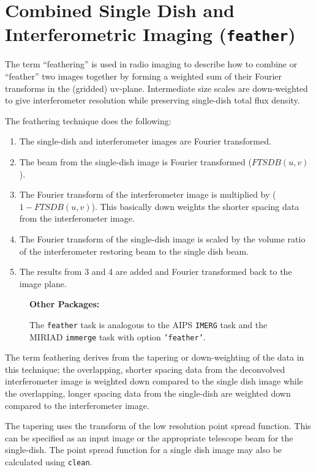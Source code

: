 \section{Combined Single Dish and Interferometric Imaging 
         ({\tt feather})}
\label{section:im.feather}

The term ``feathering'' is used in radio imaging to describe how to
combine or ``feather'' two images together by forming a weighted
sum of their Fourier transforms in the (gridded) uv-plane.
Intermediate size scales are down-weighted to give interferometer
resolution while preserving single-dish total flux density.

The feathering technique does the following:
\begin{enumerate}
\item The single-dish and interferometer images are Fourier
      transformed.
\item The beam from the single-dish image is Fourier transformed
      ($FTSDB(u,v)$).
\item The Fourier transform of the interferometer image is multiplied
      by ($1-FTSDB(u,v)$).  This basically down weights the shorter
      spacing data from the interferometer image.
\item The Fourier transform of the single-dish image is scaled by the
      volume ratio of the interferometer restoring beam to the single
      dish beam.
\item The results from 3 and 4 are added and Fourier transformed
      back to the image plane.
\end{enumerate}

\begin{wrapfigure}{r}{2.5in}
  \begin{boxedminipage}{2.5in}
     \centerline{\bf Other Packages:}
     The {\tt feather} task is analogous to the AIPS {\tt IMERG} 
     task and the MIRIAD {\tt immerge} task with option 
     {\tt 'feather'}.
  \end{boxedminipage}
\end{wrapfigure}
The term feathering derives from the tapering or down-weighting of the
data in this technique; the overlapping, shorter spacing data from the
deconvolved interferometer image is weighted down compared to the
single dish image while the overlapping, longer spacing data from the
single-dish are weighted down compared to the interferometer image.

The tapering uses the transform of the low resolution point spread
function. This can be specified as an input image or the appropriate
telescope beam for the single-dish.  The point spread function for a
single dish image may also be calculated using {\tt clean}.


